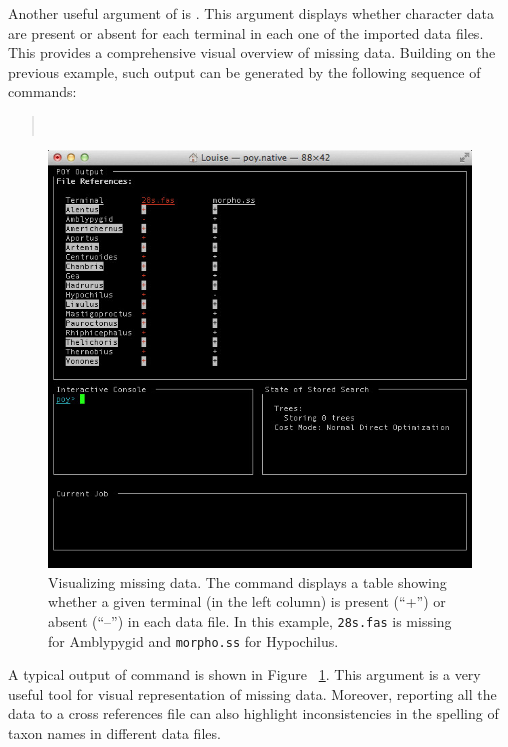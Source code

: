 {Another useful argument of  is . This argument displays whether 
character data are present or absent for each terminal in each one of the imported data files. This provides a 
comprehensive 
visual overview of missing data. Building on the previous example, such output can be generated by the following 
sequence of commands:
\begin{quote}
    \\
\end{quote}

\begin{figure}[]
    \begin{center}
        \includegraphics[width=1.0\textwidth]{doc/figures/crossref.jpg}
    \end{center}
    \caption{Visualizing missing data. The command  displays a table showing whether 
    a given terminal (in the left column) is present (``+'') or absent (``--'') in each data file. In this example, \texttt{28s.fas} 
    is missing for Amblypygid and \texttt{morpho.ss} for Hypochilus.}
    \label{fig:crossref}
\end{figure}

A typical output of  command is shown in Figure ~\ref{fig:crossref}. This argument 
is a very useful tool for visual representation of missing data. Moreover, reporting all the data to a cross references file 
can also highlight inconsistencies in the spelling of taxon names in different data files.


}
